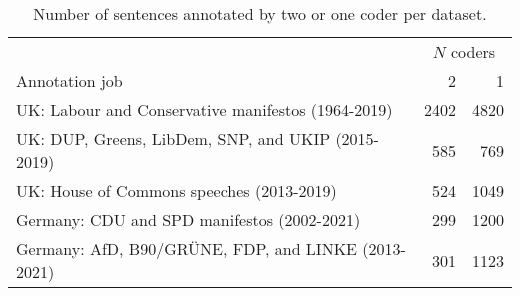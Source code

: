 \begin{table}[!t]

\caption{\label{tab:n_annotations_per_job}Number of sentences annotated by two or one coder per dataset.}
\centering
\fontsize{10}{12}\selectfont
\begin{tabular}[t]{lrr}
\toprule
\multicolumn{1}{c}{ } & \multicolumn{2}{c}{$N$ coders} \\
\cmidrule(l{3pt}r{3pt}){2-3}
Annotation job & 2 & 1\\
\midrule
UK: Labour and Conservative manifestos (1964-2019) & 2402 & 4820\\
UK: DUP, Greens, LibDem, SNP, and UKIP (2015-2019) & 585 & 769\\
UK: House of Commons speeches (2013-2019) & 524 & 1049\\
Germany: CDU and SPD manifestos (2002-2021) & 299 & 1200\\
Germany: AfD, B90/GRÜNE, FDP, and LINKE (2013-2021) & 301 & 1123\\
\bottomrule
\end{tabular}
\end{table}
